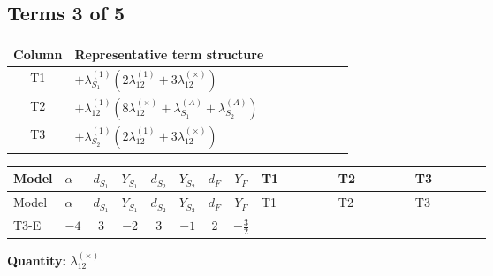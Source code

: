 \documentclass[8pt]{article}
\begin{document}
\begin{landscape}
\subsection*{Terms 3 of 5}
\begin{center}
\begin{tabular}{@{}c >{\raggedright\arraybackslash}p{0.82\linewidth}@{}}
\toprule
Column & Representative term structure \\
\midrule
T1 & \(\displaystyle +{\lambda_{S_1}^{(1)}} (2 {\lambda_{12}^{(1)}}+3 {\lambda_{12}^{(\times)}})\) \\
\midrule
T2 & \(\displaystyle +{\lambda_{12}^{(1)}} (8 {\lambda_{12}^{(\times)}}+{\lambda_{S_1}^{(A)}}+{\lambda_{S_2}^{(A)}})\) \\
\midrule
T3 & \(\displaystyle +{\lambda_{S_2}^{(1)}} (2 {\lambda_{12}^{(1)}}+3 {\lambda_{12}^{(\times)}})\) \\
\midrule
\bottomrule
\end{tabular}
\end{center}
\smallskip
\tiny
\begin{longtable}{@{}llcccccc >{\raggedright\arraybackslash}p{0.21\linewidth} >{\raggedright\arraybackslash}p{0.21\linewidth} >{\raggedright\arraybackslash}p{0.21\linewidth}@{}}
\toprule
Model & $\alpha$ & $d_{S_1}$ & $Y_{S_1}$ & $d_{S_2}$ & $Y_{S_2}$ & $d_F$ & $Y_F$ & T1 & T2 & T3 \\
\midrule
\endfirsthead
\toprule
Model & $\alpha$ & $d_{S_1}$ & $Y_{S_1}$ & $d_{S_2}$ & $Y_{S_2}$ & $d_F$ & $Y_F$ & T1 & T2 & T3 \\
\midrule
\endhead
T3-E & $-4$ & $3$ & $-2$ & $3$ & $-1$ & $2$ & $-\frac{3}{2}$ & \scriptsize\adjustbox{max width=\linewidth}{$\begin{gathered} +{\lambda_{S_1}^{(1)}} (2 {\lambda_{12}^{(1)}}+3 {\lambda_{12}^{(\times)}})\end{gathered}$} & \scriptsize\adjustbox{max width=\linewidth}{$\begin{gathered} +{\lambda_{12}^{(1)}} (8 {\lambda_{12}^{(\times)}}+{\lambda_{S_1}^{(A)}}+{\lambda_{S_2}^{(A)}})\end{gathered}$} & \scriptsize\adjustbox{max width=\linewidth}{$\begin{gathered} +{\lambda_{S_2}^{(1)}} (2 {\lambda_{12}^{(1)}}+3 {\lambda_{12}^{(\times)}})\end{gathered}$} \\
\midrule
\bottomrule
\end{longtable}
\clearpage
\noindent\textbf{Quantity: }$\lambda_{12}^{(\times)}$\par\smallskip

\end{landscape}
\end{document}
